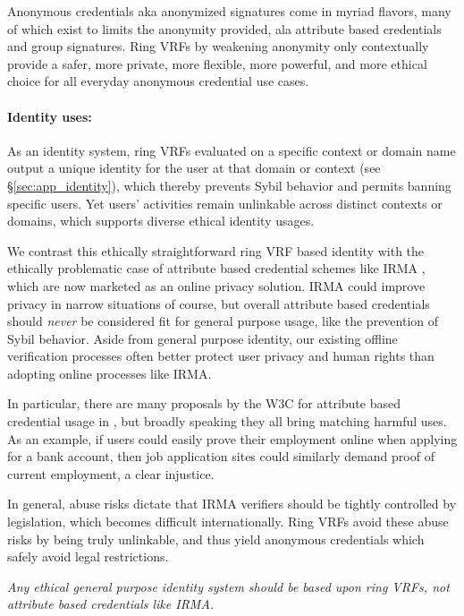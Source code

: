 Anonymous credentials aka anonymized signatures come in myriad flavors,
many of which exist to limits the anonymity provided, ala
 attribute based credentials and group signatures. %
%
Ring VRFs by weakening anonymity only contextually provide a safer,
more private, more flexible, more powerful, and more ethical
choice for all everyday anonymous credential use cases.  %

\paragraph{Identity uses:}

As an identity system, ring VRFs evaluated on a specific context or
domain name output a unique identity for the user at that domain or
context (see \S\ref{sec:app_identity}), which thereby prevents
Sybil behavior and permits banning specific users.
Yet users' activities remain unlinkable across distinct contexts or
domains, which supports diverse ethical identity usages.

We contrast this ethically straightforward ring VRF based identity
with the ethically problematic case of attribute based credential
schemes like IRMA \cite{IRMA_credentials},
 which are now marketed as an online privacy solution.
IRMA could improve privacy in narrow situations of course, but
overall attribute based credentials should {\it never} be considered
fit for general purpose usage, like the prevention of Sybil behavior.
Aside from general purpose identity, our existing offline verification
processes often better protect user privacy and human rights than
adopting online processes like IRMA.

In particular, there are many proposals by the W3C for attribute based
credential usage in \cite{w3c_vc_use_cases}, but broadly speaking they
all bring matching harmful uses.  %
As an example, if users could easily prove their employment online when
applying for a bank account, then job application sites could similarly
demand proof of current employment, a clear injustice.

In general, abuse risks dictate that IRMA verifiers should be tightly
controlled by legislation, which becomes difficult internationally. 
%
Ring VRFs avoid these abuse risks by being truly unlinkable, and thus
yield anonymous credentials which safely avoid legal restrictions.

{\it Any ethical general purpose identity system should be based
upon ring VRFs, not attribute based credentials like IRMA.}

